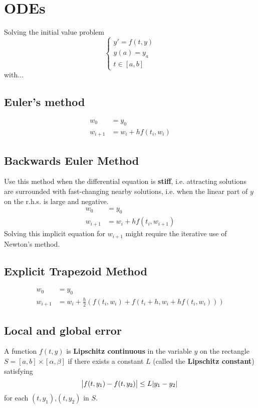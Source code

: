 \section{ODEs}
Solving the initial value problem
$$
\begin{cases}
y' = f(t,y) \\
y(a) = y_a \\
t \in [a,b]
\end{cases}
$$
with...
\subsection{Euler's method}
\begin{align*}
w_0 &= y_0 \\
w_{i+1} &= w_{i} + h f(t_i, w_i)
\end{align*}

\subsection{Backwards Euler Method}
Use this method when the differential equation is \textbf{stiff}, i.e. attracting solutions are surrounded with fast-changing nearby solutions, i.e. when the linear part of $y$ on the r.h.s. is large and negative.
\begin{align*}
w_0 &= y_0 \\
w_{i+1} &= w_{i} + h f(t_i, w_{i+1})
\end{align*}
Solving this implicit equation for $w_{i+1}$ might require the iterative use of Newton's method.
 
\subsection{Explicit Trapezoid Method}
\begin{align*}
w_0 &= y_0 \\
w_{i+1} &= w_i + \frac{h}{2}(f(t_i,w_i) + f(t_i + h, w_i + hf(t_i,w_i)))
\end{align*}

\subsection{Local and global error}
\begin{definition}
A function $f(t,y)$ is \textbf{Lipschitz continuous} in the variable $y$ on the rectangle $S = [a,b] \times [\alpha, \beta]$ if there exists a constant $L$ (called the \textbf{Lipschitz constant}) satisfying
$$
\abs{f(t,y_1) - f(t,y_2)} \leq L\abs{y_1 - y_2}
$$
for each $(t,y_1)$,$(t,y_2)$ in $S$.
\end{definition}

